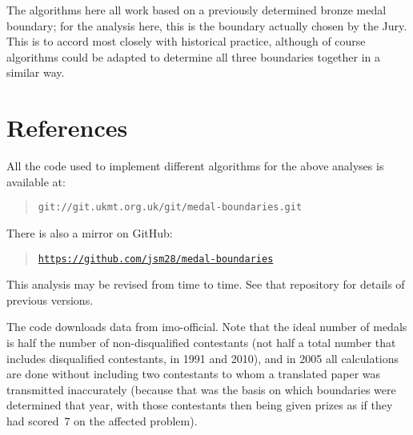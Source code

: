 \documentclass[a4paper,11pt]{article}
\begin{document}
The algorithms here all work based on a previously determined bronze
medal boundary; for the analysis here, this is the boundary actually
chosen by the Jury.  This is to accord most closely with historical
practice, although of course algorithms could be adapted to determine
all three boundaries together in a similar way.

\section*{References}

All the code used to implement different algorithms for the above
analyses is available at:

\begin{quote}
\texttt{git://git.ukmt.org.uk/git/medal-boundaries.git}
\end{quote}

There is also a mirror on GitHub:

\begin{quote}
\texttt{\href{https://github.com/jsm28/medal-boundaries}{https://github.com/jsm28/medal-boundaries}}
\end{quote}

This analysis may be revised from time to time.  See that repository
for details of previous versions.

The code downloads data from imo-official.  Note that the ideal number
of medals is half the number of non-disqualified contestants (not half
a total number that includes disqualified contestants, in 1991 and
2010), and in 2005 all calculations are done without including two
contestants to whom a translated paper was transmitted inaccurately
(because that was the basis on which boundaries were determined that
year, with those contestants then being given prizes as if they had
scored~7 on the affected problem).
\end{document}
